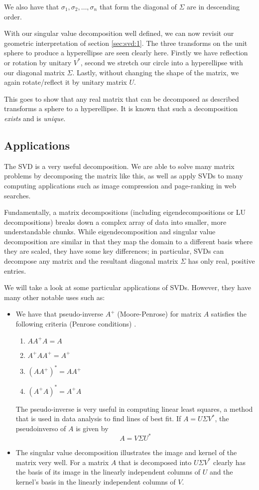 \documentclass[12pt,reqno,twoside,titlepage]{article}
\theoremstyle{definition}
\begin{document}
We also have that $\sigma_1, \sigma_2, \dots, \sigma_n$ that form the diagonal of $\Sigma$ are in descending order.

With our singular value decomposition well defined, we can now revisit our geometric interpretation of section \ref{sec:svd:1}. The three transforms on the unit sphere to produce a hyperellipse are seen clearly here. Firstly we have reflection or rotation by unitary $V^*$, second we stretch our circle into a hyperellipse with our diagonal matrix $\Sigma$. Lastly, without changing the shape of the matrix, we again rotate/reflect it by unitary matrix $U$.

This goes to show that any real matrix that can be decomposed as described transforms a sphere to a hyperellipse. It is known that such a decomposition \emph{exists} and is \emph{unique}. \cite{trefethen97}

\subsection{Applications}
\label{sec:svd:3}

The SVD is a very useful decomposition.
We are able to solve many matrix problems by decomposing the matrix like this, as well as apply SVDs to many computing applications such as image compression and page-ranking in web searches.

Fundamentally, a matrix decompositions (including eigendecompositions or LU decompositions) breaks down a complex array of data into smaller, more understandable chunks.
While eigendecomposition and singular value decomposition are similar in that they map the domain to a different basis where they are scaled, they have some key differences; in particular, SVDs can decompose any matrix and the resultant diagonal matrix $\Sigma$ has only real, positive entries.

We will take a look at some particular applications of SVDs.
However, they have many other notable uses such as:
\begin{itemize}
\item  We have that pseudo-inverse $A^+$ (Moore-Penrose) for matrix $A$ satisfies the following criteria (Penrose conditions) \cite{golub2012matrix}.
  \begin{enumerate}
  \item $AA^+A = A$
  \item $A^+AA^+ = A^+$
  \item $(AA^+)^* = AA^+$
  \item $(A^+A)^* = A^+A$
  \end{enumerate}
  The pseudo-inverse is very useful in computing linear least squares, a method that is used in data analysis to find lines of best fit.
  If $A = U \Sigma V^*$, the pseudoinverso of $A$ is given by
  \[
    A = V \Sigma U^*
  \]
\item The singular value decomposition illustrates the image and kernel of the matrix very well.
  For a matrix $A$ that is decomposed into $U \Sigma V^*$ clearly has the basis of its image in the linearly independent columns of $U$ and the kernel's basis in the linearly independent columns of $V$.
\end{itemize}
\end{document}
